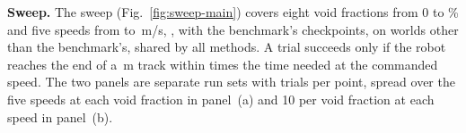 \noindent\textbf{Sweep.}\label{app:sweep}
 The sweep (Fig.~\ref{fig:sweep-main}) covers eight void
fractions from 0 to \corlOcsMaxVoidPct\% and five speeds
from \corlOcsSpeedMin{} to \corlOcsSpeedMax\,m/s, , with
the benchmark's checkpoints, on worlds other than the
benchmark's, shared by all methods. A trial succeeds only if the robot
reaches the end of a \corlOcsTrackM\,m track within \corlOcsTimeFactor{}
times the time needed at the commanded speed. The two panels are separate run sets with
\corlOcsTrialsPerPoint{} trials per point, spread over the five speeds
at each void fraction in panel~(a) and 10 per void fraction at each
speed in panel~(b).

